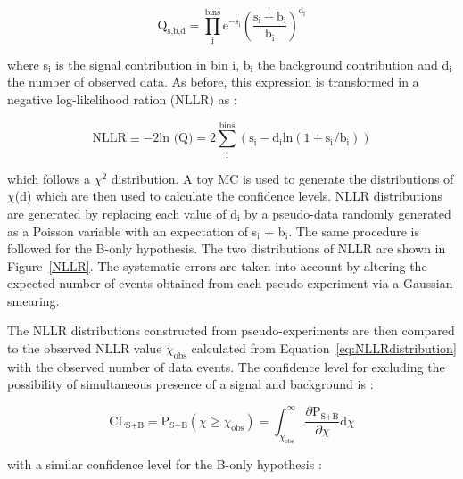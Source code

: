 \documentclass[main.tex]{subfiles}
\begin{document}
\begin{equation}
\text{Q}_{\text{s,b,d}} = \prod^{\text{bins}}_\text{i}  \text{e}^{-\text{s}_\text{i}} \left( \frac{\text{s}_\text{i} + \text{b}_\text{i}}{\text{b}_\text{i}} \right)^{\text{d}_\text{i}}
\end{equation}

\bigskip


\NI where s$_\text{i}$ is the signal contribution in bin i, b$_\text{i}$ the background contribution and d$_\text{i}$ the number of observed data. As before, this expression is transformed in a negative log-likelihood ration (NLLR) as :


\begin{equation}\label{eq:NLLRdistribution}
\text{NLLR} \equiv -\text{2} \text{ln (Q)} = \text{2} \sum _\text{i}^{\text{bins}} (\text{s}_\text{i}  - \text{d}_\text{i} \text{ln} (1 + \text{s}_\text{i}/\text{b}_\text{i}))
\end{equation}


\bigskip


\NI which follows a $\chi^\text{2}$ distribution. A toy MC is used to generate the distributions of $\chi$(d) which are then used to calculate the confidence levels. NLLR distributions are generated by replacing each value of d$_\text{i}$ by a pseudo-data randomly generated as a Poisson variable with an expectation of s$_\text{i}$ + b$_\text{i}$. The same procedure is followed for the B-only hypothesis. The two distributions of NLLR are shown in Figure~\ref{NLLR}. The systematic errors are taken into account by altering the expected number of events obtained from each pseudo-experiment via a Gaussian smearing.


\bigskip


\NI The NLLR distributions constructed from pseudo-experiments are then compared to the observed NLLR value $\chi_{\text{obs}}$ calculated from Equation~\ref{eq:NLLRdistribution} with the observed number of data events. The confidence level for excluding the possibility  of simultaneous presence of a signal and background is : 


\begin{equation}
\text{CL}_{\text{S+B}} = \text{P}_{\text{S+B}} (\chi \geq \chi_{\text{obs}} ) = \int_{\chi_{\text{obs}}}^{\infty} \frac{\partial \text{P}_{\text{S+B}} }{\partial \chi} 	\text{d}\chi 
\end{equation}


\bigskip


\NI with a similar confidence level for the B-only hypothesis : 
\end{document}
